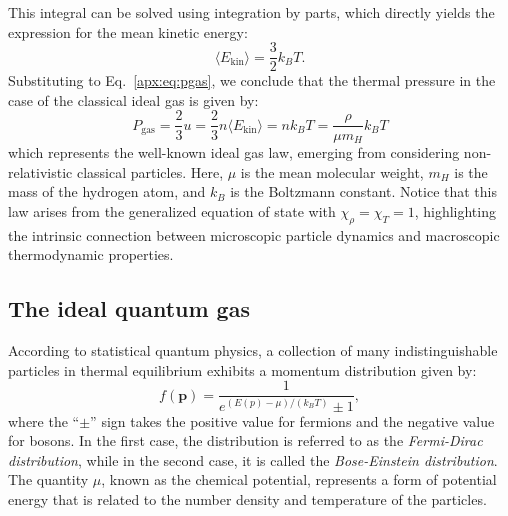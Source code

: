\documentclass[main.tex]{subfiles}
\begin{document}
This integral can be solved using integration by parts, which directly yields the expression for the mean kinetic energy:
\begin{equation*}
    \langle E_\mathrm{kin} \rangle = \frac{3}{2}k_BT.
\end{equation*}
Substituting to Eq.~\eqref{apx:eq:pgas}, we conclude that the thermal pressure in the case of the classical ideal gas is given by:
\begin{equation}
    \boxed{P_{\text{gas}} = \frac{2}{3}u = \frac{2}{3} n \langle E_{\text{kin}} \rangle = nk_BT = \frac{\rho}{\mu m_H}k_BT}
\end{equation}
which represents the well-known ideal gas law, emerging from considering non-relativistic classical particles. Here, $\mu$ is the mean molecular weight, $m_H$ is the mass of the hydrogen atom, and $k_B$ is the Boltzmann constant.
Notice that this law arises from the generalized equation of state with $\chi_\rho = \chi_T = 1$, highlighting the intrinsic connection between microscopic particle dynamics and macroscopic thermodynamic properties.



\subsection{The ideal quantum gas}

According to statistical quantum physics, a collection of many indistinguishable particles in thermal equilibrium exhibits a momentum distribution given by:
    \begin{equation}
    f(\boldsymbol{p}) = \frac{1}{e^{(E(p) - \mu) / (k_B T)} \pm 1},
    \end{equation}
where the ``$\pm$'' sign takes the positive value for fermions and the negative value for bosons. In the first case, the distribution is referred to as the \textit{Fermi-Dirac distribution}, while in the second case, it is called the \textit{Bose-Einstein distribution}. The quantity $\mu$, known as the chemical potential, represents a form of potential energy that is related to the number density and temperature of the particles.
\end{document}
